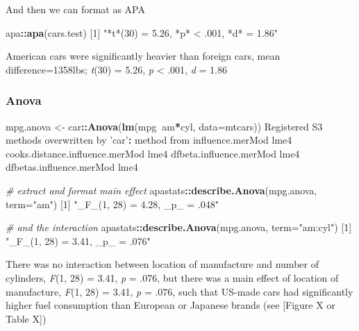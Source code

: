 \documentclass[]{article}
\newenvironment{Shaded}{\begin{snugshade}}{\end{snugshade}}
\newcommand{\CommentTok}[1]{\textcolor[rgb]{0.56,0.35,0.01}{\textit{#1}}}
\newcommand{\DataTypeTok}[1]{\textcolor[rgb]{0.13,0.29,0.53}{#1}}
\newcommand{\DecValTok}[1]{\textcolor[rgb]{0.00,0.00,0.81}{#1}}
\newcommand{\KeywordTok}[1]{\textcolor[rgb]{0.13,0.29,0.53}{\textbf{#1}}}
\newcommand{\NormalTok}[1]{#1}
\newcommand{\OperatorTok}[1]{\textcolor[rgb]{0.81,0.36,0.00}{\textbf{#1}}}
\newcommand{\StringTok}[1]{\textcolor[rgb]{0.31,0.60,0.02}{#1}}
\begin{document}
And then we can format as APA

\begin{Shaded}
\begin{Highlighting}[]
\NormalTok{apa}\OperatorTok{::}\KeywordTok{apa}\NormalTok{(cars.test)}
\NormalTok{[}\DecValTok{1}\NormalTok{] }\StringTok{"*t*(30) = 5.26, *p* < .001, *d* = 1.86"}
\end{Highlighting}
\end{Shaded}

{American cars were significantly heavier than foreign cars, mean
difference=1358lbs;
\emph{t}(30) = 5.26, \emph{p} \textless{} .001, \emph{d} = 1.86}

\hypertarget{anova-1}{%
\subsubsection*{Anova}\label{anova-1}}

\begin{Shaded}
\begin{Highlighting}[]
\NormalTok{mpg.anova <-}\StringTok{ }\NormalTok{car}\OperatorTok{::}\KeywordTok{Anova}\NormalTok{(}\KeywordTok{lm}\NormalTok{(mpg}\OperatorTok{~}\NormalTok{am}\OperatorTok{*}\NormalTok{cyl, }\DataTypeTok{data=}\NormalTok{mtcars))}
\NormalTok{Registered S3 methods overwritten by }\StringTok{'car'}\OperatorTok{:}
\StringTok{  }\NormalTok{method                          from}
\NormalTok{  influence.merMod                lme4}
\NormalTok{  cooks.distance.influence.merMod lme4}
\NormalTok{  dfbeta.influence.merMod         lme4}
\NormalTok{  dfbetas.influence.merMod        lme4}

\CommentTok{# extract and format main effect}
\NormalTok{apastats}\OperatorTok{::}\KeywordTok{describe.Anova}\NormalTok{(mpg.anova, }\DataTypeTok{term=}\StringTok{"am"}\NormalTok{)}
\NormalTok{[}\DecValTok{1}\NormalTok{] }\StringTok{"_F_(1, 28) = 4.28, _p_ = .048"}

\CommentTok{# and the interaction}
\NormalTok{apastats}\OperatorTok{::}\KeywordTok{describe.Anova}\NormalTok{(mpg.anova, }\DataTypeTok{term=}\StringTok{"am:cyl"}\NormalTok{)}
\NormalTok{[}\DecValTok{1}\NormalTok{] }\StringTok{"_F_(1, 28) = 3.41, _p_ = .076"}
\end{Highlighting}
\end{Shaded}

{There was no interaction between location of manufacture and number of
cylinders, \emph{F}(1, 28) = 3.41, \emph{p} = .076, but there was
a main effect of location of manufacture,
\emph{F}(1, 28) = 3.41, \emph{p} = .076, such that US-made cars
had significantly higher fuel consumption than European or Japanese brands (see
{[}Figure X or Table X{]})}
\end{document}
